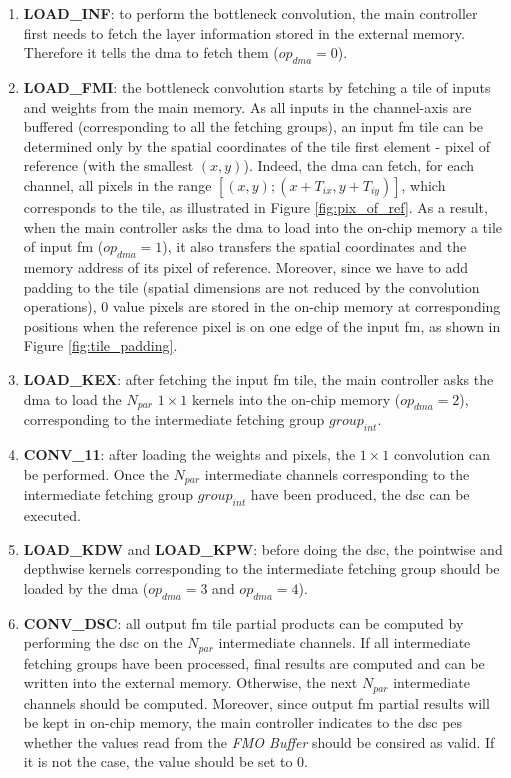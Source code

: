 \begin{enumerate}
    \item \textbf{LOAD\_INF}: to perform the bottleneck convolution, the main controller first needs to fetch the layer information stored in the external memory. Therefore it tells the \acrshort{dma} to fetch them ($op_{dma} = 0$).
    \item \textbf{LOAD\_FMI}: the bottleneck convolution starts by fetching a tile of inputs and weights from the main memory. As all inputs in the channel-axis are buffered (corresponding to all the fetching groups), an input \acrshort{fm} tile can be determined only by the spatial coordinates of the tile first element - pixel of reference (with the smallest $(x, y)$). Indeed, the \acrshort{dma} can fetch, for each channel, all pixels in the range $[(x, y); (x+T_{ix}, y+T_{iy})]$, which corresponds to the tile, as illustrated in Figure \ref{fig:pix_of_ref}.
    As a result, when the main controller asks the \acrshort{dma} to load into the on-chip memory a tile of input \acrshort{fm} ($op_{dma} = 1$), it also transfers the spatial coordinates and the memory address of its pixel of reference. Moreover, since we have to add padding to the tile (spatial dimensions are not reduced by the convolution operations), 0 value pixels are stored in the on-chip memory at corresponding positions when the reference pixel is on one edge of the input \acrshort{fm}, as shown in Figure \ref{fig:tile_padding}.
    \item \textbf{LOAD\_KEX}: after fetching the input \acrshort{fm} tile, the main controller asks the \acrshort{dma} to load the $N_{par}$ $1 \times 1$ kernels into the on-chip memory ($op_{dma} = 2$), corresponding to the intermediate fetching group $group_{int}$. %
    \item \textbf{CONV\_11}: after loading the weights and pixels, the $1 \times 1$ convolution can be performed. Once the $N_{par}$ intermediate channels corresponding to the intermediate fetching group $group_{int}$ have been produced, the \acrshort{dsc} can be executed.
    \item \textbf{LOAD\_KDW} and \textbf{LOAD\_KPW}: before doing the \acrshort{dsc}, the pointwise and depthwise kernels corresponding to the intermediate fetching group should be loaded by the \acrshort{dma} ($op_{dma} = 3$ and $op_{dma} = 4$).
    \item \textbf{CONV\_DSC}: all output \acrshort{fm} tile partial products can be computed by performing the \acrshort{dsc} on the $N_{par}$ intermediate channels. If all intermediate fetching groups have been processed, final results are computed and can be written into the external memory. Otherwise, the next $N_{par}$ intermediate channels should be computed. Moreover, since output \acrshort{fm} partial results will be kept in on-chip memory, the main controller indicates to the \acrshort{dsc} \acrshort{pe}s whether the values read from the \textit{FMO Buffer} should be consired as valid. If it is not the case, the value should be set to 0.

\end{enumerate}
